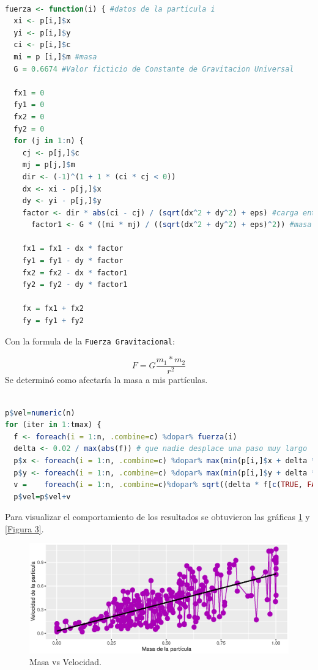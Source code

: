 \documentclass{article}
\begin{document}
\begin{lstlisting}[language=R, caption= Segmento de c\'odigo funci\'on-masa.]

fuerza <- function(i) { #datos de la particula i
  xi <- p[i,]$x
  yi <- p[i,]$y
  ci <- p[i,]$c
  mi = p [i,]$m #masa
  G = 0.6674 #Valor ficticio de Constante de Gravitacion Universal
  
  fx1 = 0
  fy1 = 0
  fx2 = 0
  fy2 = 0
  for (j in 1:n) {
    cj <- p[j,]$c
    mj = p[j,]$m
    dir <- (-1)^(1 + 1 * (ci * cj < 0))
    dx <- xi - p[j,]$x
    dy <- yi - p[j,]$y
    factor <- dir * abs(ci - cj) / (sqrt(dx^2 + dy^2) + eps) #carga entre particulas
      factor1 <- G * ((mi * mj) / ((sqrt(dx^2 + dy^2) + eps)^2)) #masa entre particulas
    
    fx1 = fx1 - dx * factor
    fy1 = fy1 - dy * factor
    fx2 = fx2 - dx * factor1
    fy2 = fy2 - dy * factor1
    
    fx = fx1 + fx2
    fy = fy1 + fy2
\end{lstlisting}

Con la formula de la \texttt{Fuerza Gravitacional}\cite{ecuaciones}:

\begin{equation}
\label{eq:FzaGravitacional}
F = G \dfrac{m_1 * m_2}{r^2}
\end{equation}
\bigskip
Se determin\'o como afectar\'ia la masa a mis part\'iculas.
\bigskip

\begin{lstlisting}[language=R, caption= Segmento de c\'odigo velocidad.]

p$vel=numeric(n)
for (iter in 1:tmax) {
  f <- foreach(i = 1:n, .combine=c) %dopar% fuerza(i)
  delta <- 0.02 / max(abs(f)) # que nadie desplace una paso muy largo
  p$x <- foreach(i = 1:n, .combine=c) %dopar% max(min(p[i,]$x + delta * f[c(TRUE, FALSE)][i], 1), 0)
  p$y <- foreach(i = 1:n, .combine=c) %dopar% max(min(p[i,]$y + delta * f[c(FALSE, TRUE)][i], 1), 0)
  v =    foreach(i = 1:n, .combine=c)%dopar% sqrt((delta * f[c(TRUE, FALSE)][i])^2 + (delta * f[c(FALSE, TRUE)][i])^2)
  p$vel=p$vel+v
\end{lstlisting}
\bigskip

Para visualizar el comportamiento de los resultados se obtuvieron las gr\'aficas \ref{Figura 2} y \ref{Figura 3}.

\begin{figure}[htb] %
    \centering
    \includegraphics[width=150mm]{velvsmas.eps} %
    \caption{Masa vs Velocidad.}
    \label{Figura 2}
\end{figure}
\newpage
\end{document}
